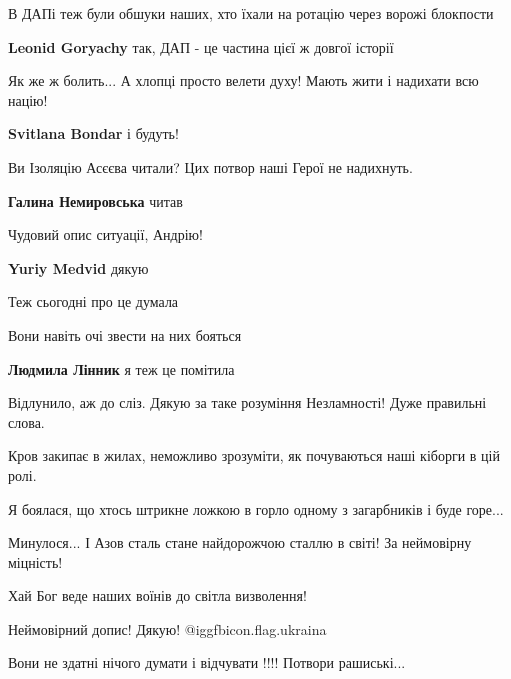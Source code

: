  
 
 
 
 
\qqSecCmt

\begin{itemize} %
В ДАПі теж були обшуки наших, хто їхали на ротацію через ворожі блокпости

\textbf{Leonid Goryachy} так, ДАП - це частина цієї ж довгої історії

Як же ж болить... А хлопці просто велети духу! Мають жити і надихати всю націю!

\textbf{Svitlana Bondar} і будуть!

Ви Ізоляцію Асєєва читали? Цих потвор наші Герої не надихнуть.

\textbf{Галина Немировська} читав

Чудовий опис ситуації, Андрію!

\textbf{Yuriy Medvid} дякую

Теж сьогодні про це думала

Вони навіть очі звести на них бояться

\textbf{Людмила Лінник} я теж це помітила

Відлунило, аж до сліз. Дякую за таке розуміння Незламності! Дуже правильні слова.


Кров закипає в жилах, неможливо зрозуміти, як почуваються наші кіборги в цій
ролі.

Я боялася, що хтось штрикне ложкою в горло одному з загарбників і буде горе...

Минулося... І Азов сталь стане найдорожчою сталлю в світі! За неймовірну
міцність!

Хай Бог веде наших воїнів до світла визволення!

Неймовірний допис! Дякую! @igg{fbicon.flag.ukraina}

Вони не здатні нічого думати і відчувати !!!! Потвори рашиські...


\end{itemize}
